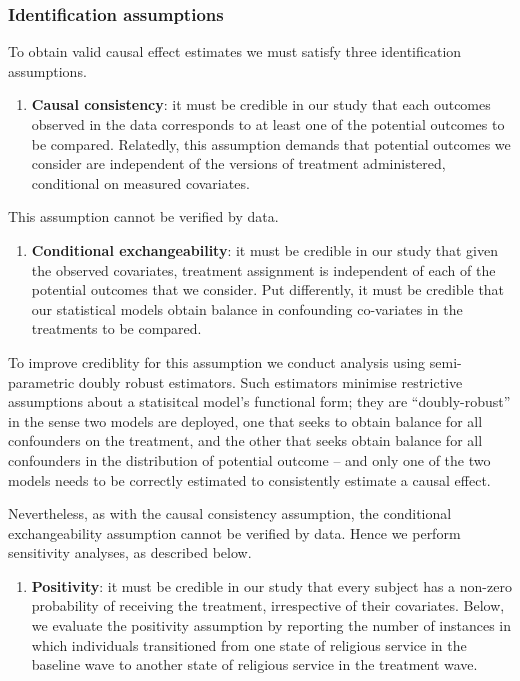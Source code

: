 \documentclass[
  singlecolumn]{article}
\providecommand{\tightlist}{%
  \setlength{\itemsep}{0pt}\setlength{\parskip}{0pt}}\usepackage{longtable,booktabs,array}
\begin{document}
\subsubsection{Identification
assumptions}\label{identification-assumptions}

To obtain valid causal effect estimates we must satisfy three
identification assumptions.

\begin{enumerate}
\def\labelenumi{\arabic{enumi}.}
\tightlist
\item
  \textbf{Causal consistency}: it must be credible in our study that
  each outcomes observed in the data corresponds to at least one of the
  potential outcomes to be compared. Relatedly, this assumption demands
  that potential outcomes we consider are independent of the versions of
  treatment administered, conditional on measured covariates.
\end{enumerate}

This assumption cannot be verified by data.

\begin{enumerate}
\def\labelenumi{\arabic{enumi}.}
\setcounter{enumi}{1}
\tightlist
\item
  \textbf{Conditional exchangeability}: it must be credible in our study
  that given the observed covariates, treatment assignment is
  independent of each of the potential outcomes that we consider. Put
  differently, it must be credible that our statistical models obtain
  balance in confounding co-variates in the treatments to be compared.
\end{enumerate}

To improve crediblity for this assumption we conduct analysis using
semi-parametric doubly robust estimators. Such estimators minimise
restrictive assumptions about a statisitcal model's functional form;
they are ``doubly-robust'' in the sense two models are deployed, one
that seeks to obtain balance for all confounders on the treatment, and
the other that seeks obtain balance for all confounders in the
distribution of potential outcome -- and only one of the two models
needs to be correctly estimated to consistently estimate a causal
effect.

Nevertheless, as with the causal consistency assumption, the conditional
exchangeability assumption cannot be verified by data. Hence we perform
sensitivity analyses, as described below.

\begin{enumerate}
\def\labelenumi{\arabic{enumi}.}
\setcounter{enumi}{2}
\tightlist
\item
  \textbf{Positivity}: it must be credible in our study that every
  subject has a non-zero probability of receiving the treatment,
  irrespective of their covariates. Below, we evaluate the positivity
  assumption by reporting the number of instances in which individuals
  transitioned from one state of religious service in the baseline wave
  to another state of religious service in the treatment wave.
\end{enumerate}
\end{document}
